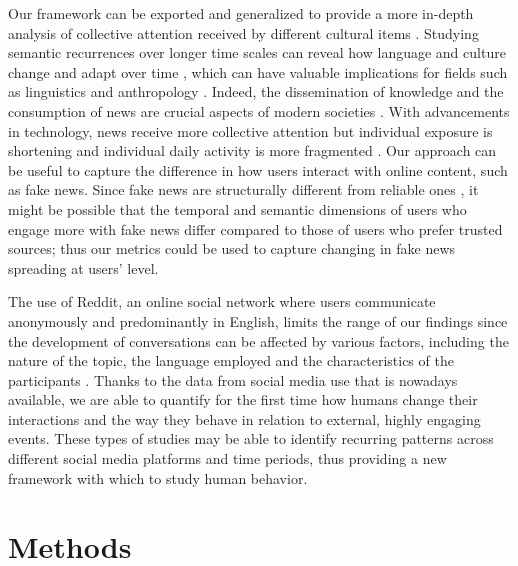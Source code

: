 \documentclass[fleqn,10pt]{wlscirep}
\begin{document}
Our framework can be exported and generalized to provide a more in-depth analysis of collective attention received by different cultural items \cite{lorenz2019accelerating}. 
Studying semantic recurrences over longer time scales can reveal how language and culture change and adapt over time \cite{nowak1999evolution,fortier2017hypermodern}, which can have valuable implications for fields such as linguistics \cite{graddol2004future} and anthropology \cite{malley2008some}. Indeed, the dissemination of knowledge and the consumption of news are crucial aspects of modern societies \cite{watts2021measuring}.
With advancements in technology, news receive more collective attention but individual exposure is shortening \cite{lorenz2019accelerating} and individual daily activity is more fragmented \cite{sullivan2018speed}.
Our approach can be useful to capture the difference in how users interact with online content, such as fake news. Since fake news are structurally different from reliable ones \cite{gravino2022supply,del2016spreading}, it might be possible that the temporal and semantic dimensions of users who engage more with fake news differ compared to those of users who prefer trusted sources; thus our metrics could be used to capture changing in fake news spreading at users' level.

The use of Reddit, an online social network where users communicate anonymously and predominantly in English, limits the range of our findings since the development of conversations can be affected by various factors, including the nature of the topic, the language employed and the characteristics of the participants \cite{stans2017role}.
Thanks to the data from social media use that is nowadays available, we are able to quantify for the first time how humans change their interactions and the way they behave in relation to external, highly engaging events. These types of studies may be able to identify recurring patterns across different social media platforms and time periods, thus providing a new framework with which to study human behavior. 
%
\section*{Methods}
%
\end{document}
